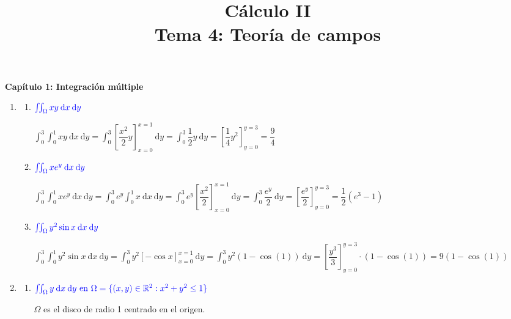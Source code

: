 
\title{Cálculo II\\ Tema 4: Teoría de campos}

\maketitle
\textbf{\Large Capítulo 1: Integración múltiple}
\begin{enumerate}[label=\color{red}\textbf{\arabic*)}, leftmargin=*]
\item {}
\begin{enumerate}[label=\color{red}\textbf{\alph*)}]
\item $\textcolor{blue}{\iint_{\Omega}xy\:\mathrm{d}x\:\mathrm{d}y}$

$\int_{0}^{3}\int_{0}^{1}xy\:\mathrm{d}x\:\mathrm{d}y=\int_{0}^{3}\left[ \dfrac{x^{2}}{2}y \right]_{x=0}^{x=1}\:\mathrm{d}y=\int_{0}^{3}\dfrac{1}{2}y\:\mathrm{d}y=\left[ \dfrac{1}{4}y^{2} \right]_{y=0}^{y=3}=\dfrac{9}{4}$  

\item $\textcolor{blue}{\iint_{\Omega}xe^{ y }\:\mathrm{d}x\:\mathrm{d}y}$

$\int_{0}^{3}\int_{0}^{1}xe^{ y }\:\mathrm{d}x\:\mathrm{d}y=\int_{0}^{3}e^{ y }\int_{0}^{1}x\:\mathrm{d}x\:\mathrm{d}y=\int_{0}^{3}e^{ y }\left[ \dfrac{x^{2}}{2} \right]_{x=0}^{x=1}\:\mathrm{d}y=\int_{0}^{3}\dfrac{e^{ y }}{2}\:\mathrm{d}y=\left[ \dfrac{e^{ y }}{2} \right]_{y=0}^{y=3}=\dfrac{1}{2}(e^{ 3 }-1)$

\item $\textcolor{blue}{\iint_{\Omega}y^{2}\sin x\:\mathrm{d}x\:\mathrm{d}y}$

$\int_{0}^{3}\int_{0}^{1}y^{2}\sin x\:\mathrm{d}x\:\mathrm{d}y=\int_{0}^{3}y^{2}\left[ -\cos x \right]_{x=0}^{x=1}\:\mathrm{d}y=\int_{0}^{3}y^{2}(1-\cos(1))\:\mathrm{d}y=\left[ \dfrac{y^{3}}{3} \right]_{y=0}^{y=3}\cdot(1-\cos(1))=9(1-\cos(1))$ 

\end{enumerate}

\item {}
\begin{enumerate}[label=\color{red}\textbf{\alph*)}]
\item $\textcolor{blue}{\iint_{\Omega}y\:\mathrm{d}x\:\mathrm{d}y\text{ en }\Omega=\{ (x,y)\in\mathbb{R}^{2}: x^{2}+y^{2}\leq 1 \}}$

$\Omega$ es el disco de radio 1 centrado en el origen.


\end{enumerate}
\end{enumerate}
